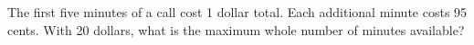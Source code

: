 The first five minutes of a call cost 1 dollar total. Each additional minute costs 95 cents. With 20 dollars, what is the maximum whole number of minutes available?
